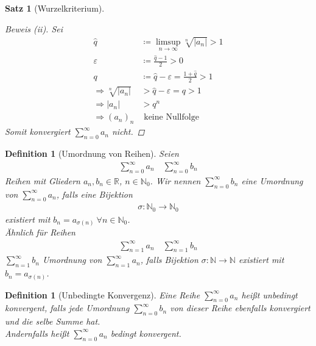 \documentclass[11pt, twoside, a4paper]{article}
\theoremstyle{plain}
\newtheorem{definition}[blockelement]{Definition}
\newtheorem{satz}[blockelement]{Satz}
\newcommand{\abs}[1]{\left\lvert#1\right\rvert}
\newcommand{\impl}[0]{\Rightarrow{}}
\newcommand{\fromto}{\rightarrow{}}
\newcommand{\definedas}[0]{\coloneqq}
\newcommand{\ntoinf}[0]{n\fromto\infty}
\newcommand{\R}{\mathbb{R}}
\newcommand{\N}{\mathbb{N}}
\begin{document}
\begin{satz}[Wurzelkriterium]
        \begin{proof}[Beweis (ii)]
            Sei
            \begin{align*}
                \hat{q}&\definedas \limsup_{\ntoinf} \sqrt[n]{\abs{a_n}} > 1\\
                \varepsilon &\definedas \frac{\hat{q}-1}{2}>0\\
                q&\definedas \hat{q}-\varepsilon = \frac{1+\hat{q}}{2} > 1\\
                \impl \sqrt[n]{\abs{a_n}} &> \hat{q}-\varepsilon = q > 1\tag{für unendlich viele $n$}\\
                \impl \abs{a_n} &> q^n\tag{für unendlich viele $n$}\\
                \impl (a_n)_n&\text{ keine Nullfolge}
            \end{align*}
            Somit konvergiert $\sum_{n=0}^{\infty} a_n$ nicht.
        \end{proof}
    \end{satz}

    \begin{definition}[Umordnung von Reihen] %
        Seien
        \begin{align*}
            \sum_{n=0}^{\infty} a_n\quad \sum_{n=0}^{\infty} b_n
        \end{align*}
        Reihen mit Gliedern $a_n, b_n\in\R$, $n\in\N_0$. Wir nennen $\sum_{n=0}^{\infty} b_n$ eine Umordnung von $\sum_{n=0}^{\infty} a_n$, falls eine Bijektion
        \begin{align*}
            \sigma: \N_0 \fromto \N_0
        \end{align*}
        existiert mit $b_n = a_{\sigma(n)}~\forall n\in\N_0$.\\
        Ähnlich für Reihen
        \begin{align*}
            \sum_{n=1}^{\infty} a_n\quad \sum_{n=1}^{\infty} b_n
        \end{align*}
        $\sum_{n=1}^{\infty} b_n$ Umordnung von $\sum_{n=1}^{\infty} a_n$, falls Bijektion $\sigma: \N \fromto\N$ existiert mit $b_n = a_{\sigma(n)}$.
    \end{definition}

    \begin{definition}[Unbedingte Konvergenz] %
        Eine Reihe $\sum_{n=0}^{\infty} a_n$ heißt unbedingt konvergent, falls jede Umordnung $\sum_{n=0}^{\infty} b_n$ von dieser Reihe ebenfalls konvergiert und die selbe Summe hat.\\
        Andernfalls heißt $\sum_{n=0}^{\infty} a_n$ bedingt konvergent.
    \end{definition}
\end{document}
